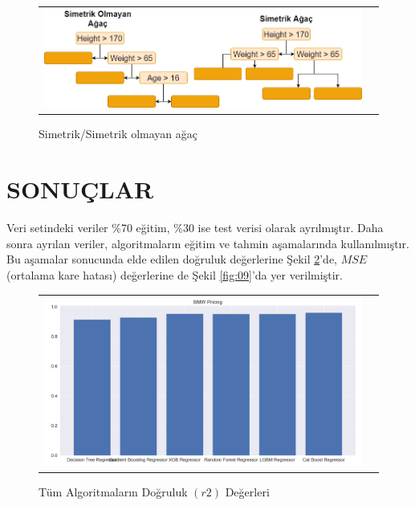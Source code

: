 \documentclass[conference]{IEEEtran}
\begin{document}
\begin{figure}[!h]
	\centering
	\begin{center}
		\begin{tabular}{cc}
			\includegraphics[scale=0.325]{pictures/pic_07.png}&
		\end{tabular}
	\end{center}
	\caption{Simetrik/Simetrik olmayan ağaç}
	\label{fig:07}
\end{figure}

\section{\textbf{SONUÇLAR}}

\quad Veri setindeki veriler \%70 eğitim, \%30 ise test verisi olarak ayrılmıştır. Daha sonra ayrılan veriler, algoritmaların eğitim ve tahmin aşamalarında kullanılmıştır. Bu aşamalar sonucunda elde edilen doğruluk değerlerine Şekil \ref{fig:08}'de, $MSE$ (ortalama kare hatası) değerlerine de Şekil \ref{fig:09}'da yer verilmiştir.

\begin{figure}[!h]
	\centering
	\begin{center}
		\begin{tabular}{cc}
			\includegraphics[scale=0.175]{pictures/pic_08.png}&
		\end{tabular}
	\end{center}
	\caption{Tüm Algoritmaların Doğruluk $(r2)$ Değerleri}
	\label{fig:08}
\end{figure}
\end{document}
